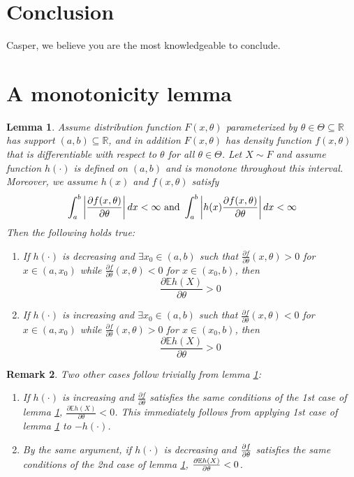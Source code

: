 \documentclass[11pt,a4]{amsart}
\newcommand{\pd}{\partial}
\newcommand{\red}{\color{darkred}}
\newtheorem{lemma}{Lemma}[section]
\newtheorem{remark}[lemma]{Remark}
\newcommand{\E }{{\mathbb E}}
\newcommand{\1}{{\mathbf 1}}
\begin{document}
\section{Conclusion}
\label{sec:4}
{\red Casper, we believe you are the most knowledgeable to conclude.}
\appendix
\section{A monotonicity lemma}
\setcounter{equation}{0}
\begin{lemma} \label{lemma:I}
  Assume distribution function $F(x, \theta)$ parameterized by 
  $\theta \in \Theta \subseteq \mathbb R$ has support
  $(a, b) \subseteq \mathbb R$,
  and in addition $F(x, \theta)$ has density
  function $f(x, \theta)$ that is differentiable with respect to
  $\theta$ for all $\theta \in \Theta$.
  Let $X \sim F$ and assume function $h(\cdot)$ is defined on $(a, b)$
  and is monotone throughout this interval.
  Moreover, we assume $h(x)$ and $f(x, \theta)$ satisfy
  \begin{equation}\label{eq:frt}
    \int_a^b \left| {\pd f(x, \theta) \over \pd \theta} \right| dx
    < \infty \text { and }
    \int_a^b \left| h(x) {\pd f(x, \theta) \over \pd \theta} \right| dx
    < \infty
  \end{equation}
  Then the following holds true:
  \begin{enumerate}
  \item If $h(\cdot)$ is decreasing and $\exists x_0 \in (a, b)$ such that
    $\frac{\pd f}{\pd \theta}(x, \theta) > 0$ for $x \in (a, x_0)$ while
    $\frac{\pd f}{\pd \theta}(x, \theta) < 0$ for $x \in (x_0, b)$, then
    \[
    \frac{\pd \E h(X)}{\pd \theta} > 0
    \]
  \item If $h(\cdot)$ is increasing and $\exists x_0 \in (a, b)$ such that 
    $\frac{\pd f}{\pd \theta}(x, \theta) < 0$ for $x \in (a, x_0)$  while
    $\frac{\pd f}{\pd \theta}(x, \theta) > 0$ for $x \in (x_0, b)$, then
    \[
    \frac{\pd \E h(X)}{\pd \theta} > 0
    \]
  \end{enumerate}
\end{lemma}
\begin{remark}
  \label{remark:I}
  Two other cases follow trivially from lemma \ref{lemma:I}:
  \begin{enumerate}
  \item If $h(\cdot)$ is increasing and $\frac{\pd f}{\pd \theta}$
    satisfies the
    same conditions of the 1st case of lemma \ref{lemma:I},
    $\frac{\pd \E h(X)}{\pd \theta} < 0$. This immediately follows
    from applying 1st case of lemma \ref{lemma:I} to $-h(\cdot)$.
  \item By the same argument, if $h(\cdot)$ is decreasing and
    ${\pd f \over \pd \theta}$ satisfies the same conditions of the
    2nd case of lemma \ref{lemma:I}, ${\pd \E h(X) \over \pd \theta} < 0$.
  \end{enumerate}
\end{remark}
\end{document}
